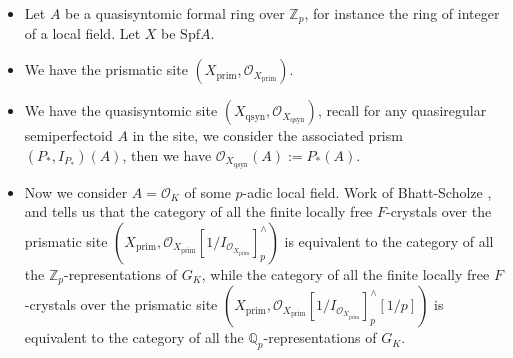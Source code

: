 \documentclass[11pt]{report}
\begin{document}
\begin{itemize}
\justifying
\item<1-> Let $A$ be a quasisyntomic formal ring over $\mathbb{Z}_p$, for instance the ring of integer of a local field. Let $X$ be $\mathrm{Spf}A$.
\item<2-> We have the prismatic site $(X_{\mathrm{prim}},\mathcal{O}_{X_{\mathrm{prim}}})$. 
\item<3-> We have the quasisyntomic site $(X_{\mathrm{qsyn}},\mathcal{O}_{X_{\mathrm{qsyn}}})$, recall for any quasiregular semiperfectoid $A$ in the site, we consider the associated prism $(P_*,I_{P_*})(A)$, then we have $\mathcal{O}_{X_{\mathrm{qsyn}}}(A):=P_*(A)$.
\item<4-> Now we consider $A=\mathcal{O}_K$ of some $p$-adic local field. Work of Bhatt-Scholze \cite{BS}, \cite{BS3} and \cite{3Sch2} tells us that the category of all the finite locally free $F$-crystals over the prismatic site $(X_{\mathrm{prim}},\mathcal{O}_{X_{\mathrm{prim}}}[1/I_{\mathcal{O}_{X_{\mathrm{prim}}}}]^\wedge_p)$ is equivalent to the category of all the $\mathbb{Z}_p$-representations of $G_K$, while the category of all the finite locally free $F$-crystals over the prismatic site $(X_{\mathrm{prim}},\mathcal{O}_{X_{\mathrm{prim}}}[1/I_{\mathcal{O}_{X_{\mathrm{prim}}}}]^\wedge_p[1/p])$ is equivalent to the category of all the $\mathbb{Q}_p$-representations of $G_K$. 


	
\end{itemize}


	
\end{document}
